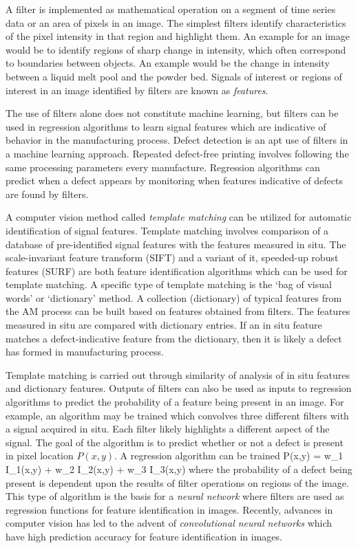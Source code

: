 A filter is implemented as mathematical operation on a segment of time series data or an area of pixels in an image. The simplest filters identify characteristics of the pixel intensity in that region and highlight them. An example for an image would be to identify regions of sharp change in intensity, which often correspond to boundaries between objects. An example would be the change in intensity between a liquid melt pool and the powder bed. Signals of interest or regions of interest in an image identified by filters are known as \textit{features}. 

The use of filters alone does not constitute machine learning, but filters can be used in regression algorithms to learn signal features which are indicative of behavior in the manufacturing process. Defect detection is an apt use of filters in a machine learning approach. Repeated defect-free printing involves following the same processing parameters every manufacture. Regression algorithms can predict when a defect appears by monitoring when features indicative of defects are found by filters. 

A computer vision method called  \textit{template matching} can be utilized for automatic identification of signal features. Template matching involves comparison of a database of pre-identified signal features with the features measured in situ. The scale-invariant feature transform (SIFT) \cite{Lowe2004} and a variant of it, speeded-up robust features (SURF) \cite{Bay2008} are both feature identification algorithms which can be used for template matching. A specific type of template matching is the `bag of visual words' or `dictionary' method. A collection (dictionary) of typical features from the AM process can be built based on features obtained from filters. The features measured in situ are compared with dictionary entries. If an in situ feature matches a defect-indicative feature from the dictionary, then it is likely a defect has formed in manufacturing process. 

Template matching is carried out through similarity of analysis of in situ features and dictionary features. Outputs of filters can also be used as inputs to regression algorithms to predict the probability of a feature being present in an image. For example, an algorithm may be trained which convolves three different filters with a signal acquired in situ. Each filter likely highlights a different aspect of the signal. The goal of the algorithm is to predict whether or not a defect is present in pixel location $P(x,y)$. A regression algorithm can be trained
\eqn
	P(x,y) = w_1 I_1(x,y) + w_2 I_2(x,y) + w_3 I_3(x,y)
	\label{filterregress}
\equ
where the probability of a defect being present is dependent upon the results of filter operations on regions of the image. This type of algorithm is the basis for a \textit{neural network} where filters are used as regression functions for feature identification in images. Recently, advances in computer vision has led to the advent of \textit{convolutional neural networks} which have high prediction accuracy for feature identification in images. 

